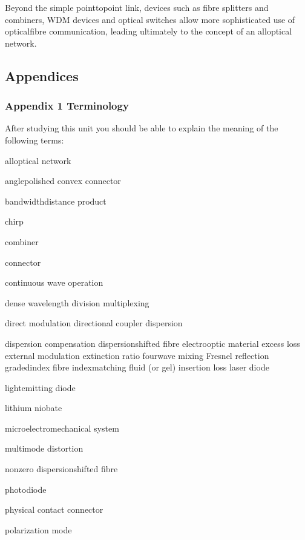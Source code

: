 \documentclass[letterpaper,10pt,english]{sphinxmanual}
\begin{document}
Beyond the simple point\sphinxhyphen{}to\sphinxhyphen{}point link, devices such as fibre splitters and combiners, WDM devices and optical switches allow more sophisticated use of optical\sphinxhyphen{}fibre communication, leading ultimately to the concept of an all\sphinxhyphen{}optical network.


\subsection{Appendices}
\label{\detokenize{content/session_00/Part_00_06:Appendices}}\label{\detokenize{content/session_00/Part_00_06::doc}}

\subsubsection{Appendix 1 Terminology}
\label{\detokenize{content/session_00/Part_00_06:Appendix-1-Terminology}}
After studying this unit you should be able to explain the meaning of the following terms:

all\sphinxhyphen{}optical network

angle\sphinxhyphen{}polished convex connector

bandwidth\sphinxhyphen{}distance product

chirp

combiner

connector

continuous wave operation

dense wavelength division multiplexing

direct modulation directional coupler dispersion

dispersion compensation dispersion\sphinxhyphen{}shifted fibre electro\sphinxhyphen{}optic material excess loss external modulation extinction ratio four\sphinxhyphen{}wave mixing Fresnel reflection graded\sphinxhyphen{}index fibre index\sphinxhyphen{}matching fluid (or gel) insertion loss laser diode

light\sphinxhyphen{}emitting diode

lithium niobate

micro\sphinxhyphen{}electro\sphinxhyphen{}mechanical system

multimode distortion

non\sphinxhyphen{}zero dispersion\sphinxhyphen{}shifted fibre

photodiode

physical contact connector

polarization mode
\end{document}
